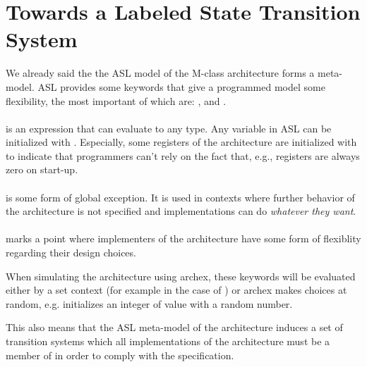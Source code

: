 \documentclass{securem}
\begin{document}
\section{Towards a Labeled State Transition System}

We already said the the ASL model of the M-class architecture forms a meta-model.
ASL provides some keywords that give a programmed model some flexibility, the most important of which are:
,  and .

\paragraph{} is an expression that can evaluate to any type.
Any variable in ASL can be initialized with .
Especially, some registers of the architecture are initialized with  to indicate that programmers can't rely on the fact that, e.g., registers are always zero on start-up.

\paragraph{} is some form of global exception.
It is used in contexts where further behavior of the architecture is not specified and implementations can do \textit{whatever they want}.

\paragraph{} marks a point where implementers of the architecture have some form of flexiblity regarding their design choices.

When simulating the architecture using archex, these keywords will be evaluated either by a set context (for example in the case of ) or archex makes choices at random, e.g. initializes an integer of value  with a random number.

This also means that the ASL meta-model of the architecture induces a set of transition systems which all implementations of the architecture must be a member of in order to comply with the specification.
\end{document}

